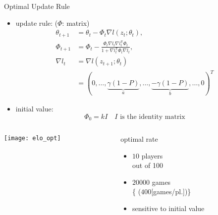 \documentclass[fleqn,aspectratio=1610]{beamer}
\begin{document}
\begin{frame}[label={sec:orgfbaa343}]{Optimal Update Rule}
\begin{itemize}
\item update rule: (\(\varPhi\): matrix)
\begin{align}
  \theta_{t+1}
  &=\theta_{t}-\varPhi_{t}\nabla l(z_{t};\theta_{t}),\\
  \varPhi_{t+1}
  &=
    \varPhi_{t}
    -\frac{\varPhi_{t}\nabla l_{t}\nabla l_{t}^{\mathsf{T}}\varPhi_{t}}
    {1+\nabla l_{t}^{\mathsf{T}}\varPhi_{t}\nabla l_{t}},\\
  \nabla l_{t}
  &=\nabla l(z_{t+1};\theta_{t})\\	 
  &=(0,\dotsc,\underbrace{\gamma(1-P)}_{a},\dotsc,
    \underbrace{-\gamma(1-P)}_{b},\dotsc,0)^{T}
\end{align}
\item initial value:
\begin{equation}
  \varPhi_{0}=k I\quad \text{\(I\) is the identity matrix}
\end{equation}
\end{itemize}
\end{frame}

\begin{frame}[label={sec:org22003a3}]{}
\begin{columns}
\begin{column}{0.65\columnwidth}
\begin{center}
  \texttt{[image: elo\_opt]}%
\end{center}
\end{column}
\begin{column}{0.35\columnwidth}
optimal rate
\begin{itemize}
\item \(10\) players\\[0pt]
out of 100
\item \(20000\) games\\[0pt]
\{\small
  (\(400\)[games/pl.])\}
\item sensitive to initial value
\end{itemize}
\end{column}
\end{columns}
\end{frame}
\end{document}
